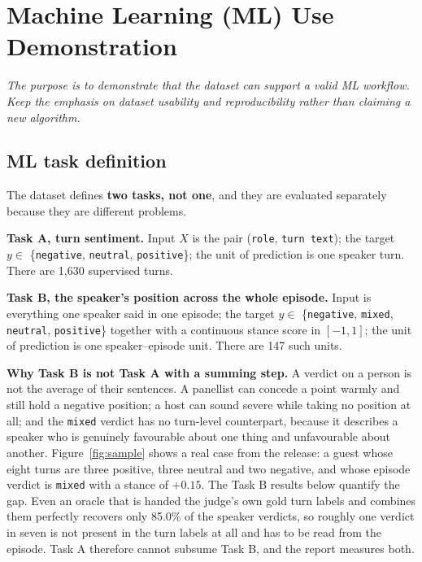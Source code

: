 \documentclass[11pt,a4paper]{article}
\begin{document}
\section{Machine Learning (ML) Use Demonstration}

\emph{\small The purpose is to demonstrate that the dataset can support a valid ML workflow. Keep
the emphasis on dataset usability and reproducibility rather than claiming a new algorithm.}

\subsection{ML task definition}

The dataset defines \textbf{two tasks, not one}, and they are evaluated separately because they
are different problems.

\vspace{2pt}
\textbf{Task A, turn sentiment.} Input $X$ is the pair (\texttt{role}, \texttt{turn text}); the
target $y \in$ \{\texttt{negative}, \texttt{neutral}, \texttt{positive}\}; the unit of prediction
is one speaker turn. There are 1{,}630 supervised turns.

\vspace{2pt}
\textbf{Task B, the speaker's position across the whole episode.} Input is everything one speaker
said in one episode; the target $y \in$ \{\texttt{negative}, \texttt{mixed}, \texttt{neutral},
\texttt{positive}\} together with a continuous stance score in $[-1, 1]$; the unit of prediction
is one speaker--episode unit. There are 147 such units.

\vspace{2pt}
\textbf{Why Task B is not Task A with a summing step.} A verdict on a person is not the average of
their sentences. A panellist can concede a point warmly and still hold a negative position; a
host can sound severe while taking no position at all; and the \texttt{mixed} verdict has no
turn-level counterpart, because it describes a speaker who is genuinely favourable about one
thing and unfavourable about another. Figure~\ref{fig:sample} shows a real case from the release: a guest whose
eight turns are three positive, three neutral and two negative, and whose episode verdict is
\texttt{mixed} with a stance of $+0.15$. The Task B results below quantify the gap. Even an oracle that is
handed the judge's own gold turn labels and combines them perfectly recovers only 85.0\% of the
speaker verdicts, so roughly one verdict in seven is not present in the turn labels at all and
has to be read from the episode. Task A therefore cannot subsume Task B, and the report measures
both.
\end{document}
